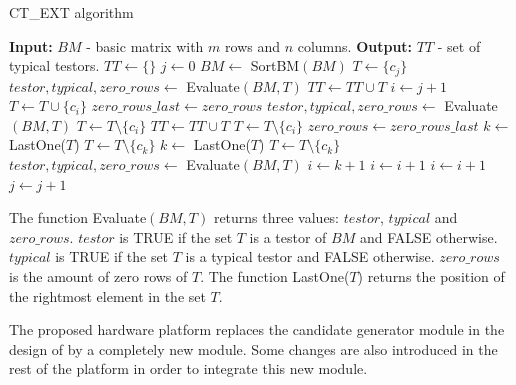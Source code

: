 \documentclass[authoryear,11pt]{elsarticle}
\begin{document}
	\begin{algorithm}
	\begin{spacing}{1.0}
	\begin{small}
	\caption{CT\_EXT algorithm}\label{ctext_algo}
	\begin{algorithmic}[1]
	\State \textbf{Input: } $BM$ - basic matrix with $m$ rows and $n$ columns.
	\State \textbf{Output: } $TT$ - set of typical testors.
	\State $TT \gets \{\}$
	\State $j \gets 0$ 
	\State $BM \gets$ SortBM$(BM)$
	\label{row1condition}
	\State $T \gets \{c_j\}$ 
	\State $testor, typical, zero\_rows \gets$ Evaluate$(BM,T)$
	 
	\State $TT \gets TT \cup T$
	\EndIf
	\Else
	\State $i \gets j+1$
	\State $T \gets T \cup \{c_i\}$
	\State $zero\_rows\_last \gets zero\_rows$
	\State $testor, typical, zero\_rows \gets$ Evaluate$(BM,T)$
	\State $T \gets T \setminus \{c_i\}$ 
	\Else
	 
	\State $TT \gets TT \cup T$
	\EndIf
	\State $T \gets T \setminus \{c_i\}$
	\State $zero\_rows \gets zero\_rows\_last$
	\EndIf
	\EndIf
	\State $k \gets$ LastOne($T$)
	\State $T \gets T \setminus \{c_k\}$
	\State $k \gets$ LastOne($T$)
	\EndIf
	\State $T \gets T \setminus \{c_k\}$
	\State $testor, typical, zero\_rows \gets$ Evaluate$(BM,T)$
	\State $i \gets k+1$
	\Else
	\State $i \gets i+1$
	\EndIf
	\Else
	\State $i \gets i+1$
	\EndIf
	\EndWhile
	\EndIf
	\State $j \gets j+1$
	\EndWhile
	\end{algorithmic}
	\end{small}
	\end{spacing}
	\end{algorithm}
	
	The function Evaluate$(BM,T)$ returns three values: $testor$, $typical$ and $zero\_rows$. $testor$ is 
	TRUE if the set $T$ is a testor of $BM$ and FALSE otherwise. $typical$ is TRUE if the set $T$ is a
	typical testor and FALSE otherwise. $zero\_rows$ is the amount of zero rows of $T$. The function
	LastOne($T$) returns the position of the rightmost element in the set $T$.
	
	The proposed hardware platform replaces the candidate generator module in the design of \citep{Rodriguez14}
	by a completely new module. Some changes are also introduced in the rest of the platform in order to integrate
	this new module.
	
\end{document}
